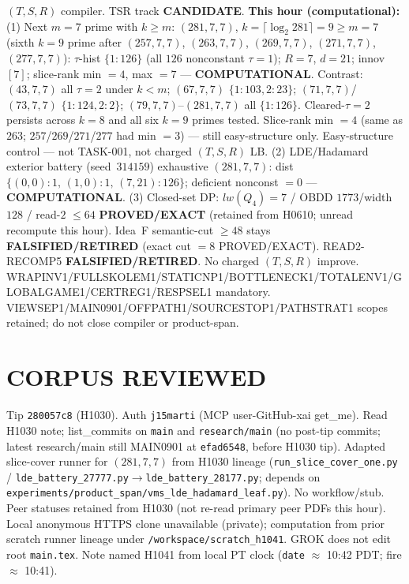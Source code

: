 \documentclass[11pt]{article}
\begin{document}
$(T,S,R)$ compiler. TSR track \textbf{CANDIDATE}.
\textbf{This hour (computational):}
(1) Next $m{=}7$ prime with $k{\ge}m$: $(281,7,7)$, $k=\lceil\log_2 281\rceil=9{\ge}m{=}7$
(sixth $k{=}9$ prime after $(257,7,7)$, $(263,7,7)$, $(269,7,7)$, $(271,7,7)$, $(277,7,7)$):
$\tau$-hist $\{1{:}126\}$ (all $126$ nonconstant $\tau{=}1$); $R{=}7$, $d{=}21$; innov $[7]$;
slice-rank min $=4$, max $=7$ --- \textbf{COMPUTATIONAL}.
Contrast: $(43,7,7)$ all $\tau{=}2$ under $k{<}m$; $(67,7,7)$ $\{1{:}103,2{:}23\}$;
$(71,7,7)$/$(73,7,7)$ $\{1{:}124,2{:}2\}$; $(79,7,7)$--$(281,7,7)$ all $\{1{:}126\}$.
Cleared-$\tau{=}2$ persists across $k{=}8$ and all six $k{=}9$ primes tested.
Slice-rank min $=4$ (same as $263$; $257$/$269$/$271$/$277$ had min $=3$) --- still easy-structure only.
Easy-structure control --- not TASK-001, not charged $(T,S,R)$ LB.
(2) LDE/Hadamard exterior battery (seed~$314159$) exhaustive $(281,7,7)$:
dist $\{(0,0){:}1,\,(1,0){:}1,\,(7,21){:}126\}$; deficient nonconst $=0$ --- \textbf{COMPUTATIONAL}.
(3) Closed-set DP: $lw(Q_4)=7$ / OBDD $1773$/width $128$ / read-$2$ $\le64$
\textbf{PROVED/EXACT} (retained from H0610; unread recompute this hour).
Idea~F semantic-cut $\ge48$ stays \textbf{FALSIFIED/RETIRED} (exact cut $=8$ PROVED/EXACT).
READ2-RECOMP5 \textbf{FALSIFIED/RETIRED}. No charged $(T,S,R)$ improve.
WRAPINV1/FULLSKOLEM1/STATICNP1/BOTTLENECK1/TOTALENV1/GLOBALGAME1/CERTREG1/RESPSEL1 mandatory.
VIEWSEP1/MAIN0901/OFFPATH1/SOURCESTOP1/PATHSTRAT1 scopes retained; do not close compiler or product-span.

\section*{CORPUS REVIEWED}
Tip \texttt{280057c8} (H1030). Auth \texttt{j15marti} (MCP user-GitHub-xai get\_me).
Read H1030 note; list\_commits on \texttt{main} and \texttt{research/main} (no post-tip commits;
latest research/main still MAIN0901 at \texttt{efad6548}, before H1030 tip).
Adapted slice-cover runner for $(281,7,7)$ from H1030 lineage
(\texttt{run\_slice\_cover\_one.py} / \texttt{lde\_battery\_27777.py}$\to$\texttt{lde\_battery\_28177.py};
depends on \texttt{experiments/product\_span/vms\_lde\_hadamard\_leaf.py}).
No workflow/stub. Peer statuses retained from H1030 (not re-read primary peer PDFs this hour).
Local anonymous HTTPS clone unavailable (private);
computation from prior scratch runner lineage under \texttt{/workspace/scratch\_h1041}.
GROK does not edit root \texttt{main.tex}.
Note named H1041 from local PT clock (\texttt{date} $\approx$ 10:42 PDT; fire $\approx$ 10:41).
\end{document}
